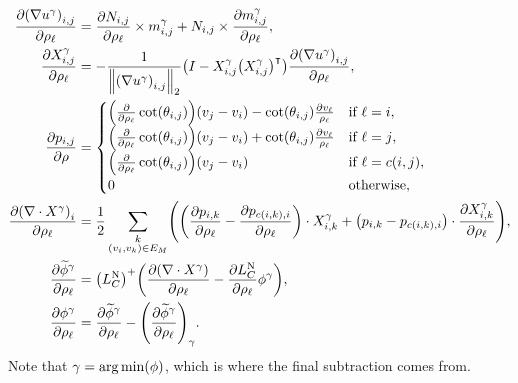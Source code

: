 \begin{align*}
	\frac{\partial \pof{\nabla u^\gamma}_{i, j}}{\partial \rho_\ell} &= \frac{\partial N_{i, j}}{\partial \rho_\ell} \times m^\gamma_{i, j} + N_{i, j} \times \frac{\partial m^\gamma_{i, j}}{\partial \rho_\ell}, \\
	\frac{\partial X^\gamma_{i, j}}{\partial \rho_\ell} &= -\frac{1}{\norm{\pof{\nabla u^\gamma}_{i, j}}_2}\pof{I - X^\gamma_{i, j}\pof{X^\gamma_{i, j}}^\intercal}\frac{\partial \pof{\nabla u^\gamma}_{i, j}}{\partial \rho_\ell}, \\
	\frac{\partial p_{i, j}}{\partial \rho} &= \begin{cases}
		\pof{\frac{\partial}{\partial \rho_\ell}\cot\pof{\theta_{i, j}}}\pof{v_j - v_i} - \cot\pof{\theta_{i, j}}\frac{\partial v_\ell}{\rho_\ell} & \text{if \(\ell = i\)}, \\
		\pof{\frac{\partial}{\partial \rho_\ell}\cot\pof{\theta_{i, j}}}\pof{v_j - v_i} + \cot\pof{\theta_{i, j}}\frac{\partial v_\ell}{\rho_\ell} & \text{if \(\ell = j\)}, \\
		\pof{\frac{\partial}{\partial \rho_\ell}\cot\pof{\theta_{i, j}}}\pof{v_j - v_i} & \text{if \(\ell = c\pof{i, j}\)}, \\
		0 & \text{otherwise},
	\end{cases} \\
	\frac{\partial \pof{\nabla \cdot X^\gamma}_i}{\partial \rho_\ell} &= \frac{1}{2}\sum_{\substack{k \\ \pof{v_i, v_k} \in E_M}}\pof{\pof{\frac{\partial p_{i, k}}{\partial \rho_\ell} - \frac{\partial p_{c\pof{i, k}, i}}{\partial \rho_\ell}} \cdot X^\gamma_{i, k} + \pof{p_{i, k} - p_{c\pof{i, k}, i}} \cdot \frac{\partial X^\gamma_{i, k}}{\partial \rho_\ell}}, \\
	\frac{\partial \widetilde{\phi}^\gamma}{\partial \rho_\ell} &= \pof{L_C^{\text{N}}}^+\pof{\frac{\partial \pof{\nabla \cdot X^\gamma}}{\partial \rho_\ell} - \frac{\partial L_C^{\text{N}}}{\partial \rho_\ell}\phi^\gamma}, \\
	\frac{\partial \phi^\gamma}{\partial \rho_\ell} &= \frac{\partial \widetilde{\phi}^\gamma}{\partial \rho_\ell} - \pof{\frac{\partial \widetilde{\phi}^\gamma}{\partial \rho_\ell}}_{\gamma}.
\end{align*} Note that \(\gamma = \mathrm{arg\,min}\pof{\phi}\), which is where the final subtraction comes from.
